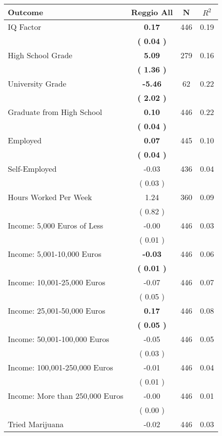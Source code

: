 \begin{tabular}{lccc}
\toprule
 \textbf{Outcome} & \textbf{Reggio All} & \textbf{N} & \textbf{$ R^2$} \\
\midrule
IQ Factor & \textbf{     0.17} & 446 &      0.19 \\ 
 & \textbf{(     0.04 )} & \\
High School Grade & \textbf{     5.09} & 279 &      0.16 \\ 
 & \textbf{(     1.36 )} & \\
University Grade & \textbf{    -5.46} & 62 &      0.22 \\ 
 & \textbf{(     2.02 )} & \\
Graduate from High School & \textbf{     0.10} & 446 &      0.22 \\ 
 & \textbf{(     0.04 )} & \\
Employed & \textbf{     0.07} & 445 &      0.10 \\ 
 & \textbf{(     0.04 )} & \\
Self-Employed &     -0.03 & 436 &      0.04 \\ 
 & (     0.03 ) & \\
Hours Worked Per Week &      1.24 & 360 &      0.09 \\ 
 & (     0.82 ) & \\
Income: 5,000 Euros of Less &     -0.00 & 446 &      0.03 \\ 
 & (     0.01 ) & \\
Income: 5,001-10,000 Euros & \textbf{    -0.03} & 446 &      0.06 \\ 
 & \textbf{(     0.01 )} & \\
Income: 10,001-25,000 Euros &     -0.07 & 446 &      0.07 \\ 
 & (     0.05 ) & \\
Income: 25,001-50,000 Euros & \textbf{     0.17} & 446 &      0.08 \\ 
 & \textbf{(     0.05 )} & \\
Income: 50,001-100,000 Euros &     -0.05 & 446 &      0.05 \\ 
 & (     0.03 ) & \\
Income: 100,001-250,000 Euros &     -0.01 & 446 &      0.04 \\ 
 & (     0.01 ) & \\
Income: More than 250,000 Euros &     -0.00 & 446 &      0.01 \\ 
 & (     0.00 ) & \\
Tried Marijuana &     -0.02 & 446 &      0.03 \\ 

\end{tabular}
